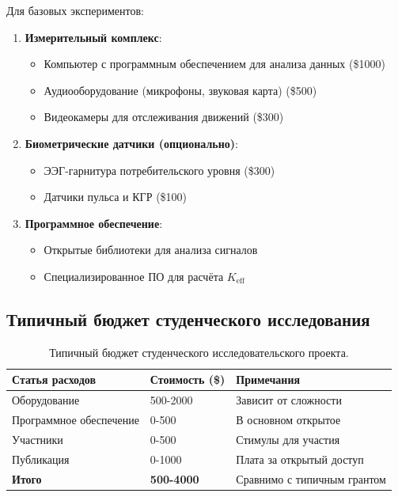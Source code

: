 \documentclass[12pt,a4paper]{article}
\begin{document}
	Для базовых экспериментов:
	\begin{enumerate}
		\item \textbf{Измерительный комплекс}:
		\begin{itemize}
			\item Компьютер с программным обеспечением для анализа данных (\$1000)
			\item Аудиооборудование (микрофоны, звуковая карта) (\$500)
			\item Видеокамеры для отслеживания движений (\$300)
		\end{itemize}
		
		\item \textbf{Биометрические датчики (опционально)}:
		\begin{itemize}
			\item ЭЭГ-гарнитура потребительского уровня (\$300)
			\item Датчики пульса и КГР (\$100)
		\end{itemize}
		
		\item \textbf{Программное обеспечение}:
		\begin{itemize}
			\item Открытые библиотеки для анализа сигналов
			\item Специализированное ПО для расчёта $K_{\mathrm{eff}}$
		\end{itemize}
	\end{enumerate}
	
	\subsection{Типичный бюджет студенческого исследования}
	
	\begin{table}[h]
		\centering
		\begin{tabular}{p{}p{}p{}}
			\toprule
			\textbf{Статья расходов} & \textbf{Стоимость (\$)} & \textbf{Примечания} \\
			\midrule
			Оборудование & 500-2000 & Зависит от сложности \\
			Программное обеспечение & 0-500 & В основном открытое \\
			Участники & 0-500 & Стимулы для участия \\
			Публикация & 0-1000 & Плата за открытый доступ \\
			\midrule
			\textbf{Итого} & \textbf{500-4000} & Сравнимо с типичным грантом \\
			\bottomrule
		\end{tabular}
		\caption{Типичный бюджет студенческого исследовательского проекта.}
		\label{tab:student-budget}
	\end{table}
	
\end{document}
